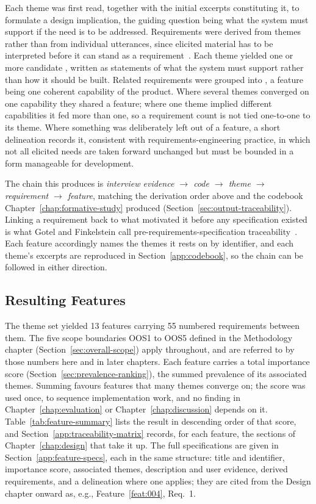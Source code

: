 Each theme was first read, together with the initial excerpts constituting it, to formulate a design implication, the guiding question being what the system must support if the need is to be addressed. Requirements were derived from themes rather than from individual utterances, since elicited material has to be interpreted before it can stand as a requirement~\cite[p.~39]{nuseibeh_requirements_2000}. Each theme yielded one or more candidate , written as statements of what the system must support rather than how it should be built. Related requirements were grouped into \emph{}, a feature being one coherent capability of the product. Where several themes converged on one capability they shared a feature; where one theme implied different capabilities it fed more than one, so a requirement count is not tied one-to-one to its theme. Where something was deliberately left out of a feature, a short delineation records it, consistent with requirements-engineering practice, in which not all elicited needs are taken forward unchanged but must be bounded in a form manageable for development.

The chain this produces is \emph{interview evidence $\rightarrow$ code $\rightarrow$ theme $\rightarrow$ requirement $\rightarrow$ feature}, matching the derivation order above and the codebook Chapter~\ref{chap:formative-study} produced (Section~\ref{sec:output-traceability}). Linking a requirement back to what motivated it before any specification existed is what Gotel and Finkelstein call pre-requirements-specification traceability~\cite[p.~97]{gotel_analysis_1994}. Each feature accordingly names the themes it rests on by identifier, and each theme's excerpts are reproduced in Section~\ref{app:codebook}, so the chain can be followed in either direction.

\subsection{Resulting Features}
\label{sec:resulting-features}

The theme set yielded 13 features carrying 55 numbered requirements between them. The five scope boundaries OOS1 to OOS5 defined in the Methodology chapter (Section~\ref{sec:overall-scope}) apply throughout, and are referred to by those numbers here and in later chapters. Each feature carries a total importance score (Section~\ref{sec:prevalence-ranking}), the summed prevalence of its associated themes. Summing favours features that many themes converge on; the score was used once, to sequence implementation work, and no finding in Chapter~\ref{chap:evaluation} or Chapter~\ref{chap:discussion} depends on it. Table~\ref{tab:feature-summary} lists the result in descending order of that score, and Section~\ref{app:traceability-matrix} records, for each feature, the sections of Chapter~\ref{chap:design} that take it up. The full specifications are given in Section~\ref{app:feature-specs}, each in the same structure: title and identifier, importance score, associated themes, description and user evidence, derived requirements, and a delineation where one applies; they are cited from the Design chapter onward as, e.g., Feature~\ref{feat:004}, Req.~1.

